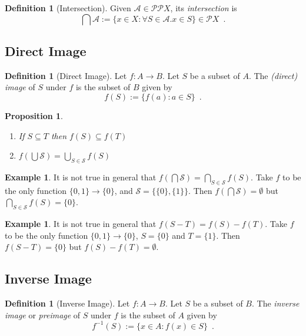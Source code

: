\documentclass{book}
\newtheorem{prop}[ax]{Proposition}
\theoremstyle{definition}
\newtheorem{df}[ax]{Definition}
\newtheorem{ex}[ax]{Example}
\newcommand{\inv}[1]{\ensuremath{{#1}^{-1}}}
\begin{document}
\begin{df}[Intersection]
Given $\mathcal{A} \in \mathcal{P} \mathcal{P} X$, its \emph{intersection} is
\[ \bigcap \mathcal{A} := \{ x \in X : \forall S \in \mathcal{A}. x \in S \} \in \mathcal{P} X \enspace . \]
\end{df}

\subsection{Direct Image} %

\begin{df}[Direct Image]
Let $f : A \rightarrow B$. Let $S$ be a subset of $A$. The \emph{(direct) image} of $S$ under $f$ is the subset of $B$ given by
\[ f(S) := \{ f(a) : a \in S \} \enspace . \]
\end{df}

\begin{prop}
$ $
\begin{enumerate}
\item If $S \subseteq T$ then $f(S) \subseteq f(T)$
\item $f(\bigcup \mathcal{S}) = \bigcup_{S \in \mathcal{S}} f(S)$
\end{enumerate}
\end{prop}

\begin{ex}
It is not true in general that $f(\bigcap \mathcal{S}) = \bigcap_{S \in \mathcal{S}} f(S)$. Take $f$ to be the only function $\{0,1\} \rightarrow \{0\}$, and $\mathcal{S} = \{\{0\},\{1\}\}$. Then $f(\bigcap \mathcal{S}) = \emptyset$ but $\bigcap_{S \in \mathcal{S}} f(S) = \{0\}$.
\end{ex}

\begin{ex}
It is not true in general that $f(S - T) = f(S) - f(T)$. Take $f$ to be the only function $\{0,1\} \rightarrow \{0\}$, $S = \{0\}$ and $T = \{1\}$. Then $f(S-T) = \{0\}$ but $f(S) - f(T) = \emptyset$.
\end{ex}

\subsection{Inverse Image} %

\begin{df}[Inverse Image]
Let $f : A \rightarrow B$. Let $S$ be a subset of $B$. The \emph{inverse image} or \emph{preimage} of $S$ under $f$ is the subset of $A$ given by
\[ \inv{f}(S) := \{ x \in A : f(x) \in S \} \enspace . \]
\end{df}
\end{document}
